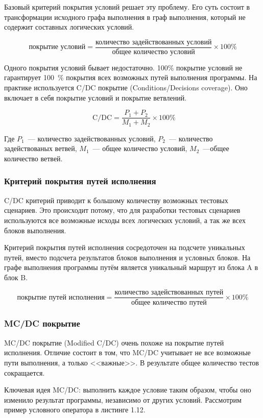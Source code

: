 Базовый критерий покрытия условий решает эту проблему. Его суть состоит в трансформации исходного графа выполнения в граф выполнения, который не содержит составных логических условий. 

\[ \text{покрытие условий} = \frac{\text{количество задействованных условий}}{\text{общее количество условий}}  \times 100 \% \]

Одного покрытия условий бывает недостаточно. 100\% покрытие условий не гарантирует 100~\% покрытия всех возможных путей выполнения программы. На практике используется C/DC покрытие (Conditions/Decisions coverage). Оно включает в себя покрытие условий и покрытие ветвлений.

\[ \text{ C/DC} = \frac{P_1 + P_2}{M_1 + M_2} \times 100 \% \]

Где \(P_1\)~--- количество задействованных условий, \(P_2\)~--- количество задействованых ветвей, \(M_1\)~--- общее количество условий, \(M_2\)~---общее количество ветвей.

\subsubsection{Критерий покрытия путей исполнения}

C/DC критерий приводит к большому количеству возможных тестовых сценариев. Это происходит потому, что для разработки тестовых сценариев используются все возможные исходы всех логических условий, а так же всех блоков выполнения.

Критерий покрытия путей исполнения сосредоточен на подсчете уникальных путей, вместо подсчета результатов блоков выполнения и условных блоков. На графе выполнения программы путём является уникальный маршрут из блока A в блок B.

\[ \text{покрытие путей исполнения} = \frac{\text{количество задействованных путей}}{\text{общее количество путей}}  \times 100 \% \]

\subsubsection{MC/DC покрытие}

MC/DC покрытие (Modified C/DC) очень похоже на покрытие путей исполнения. Отличие состоит в том, что MC/DC учитывает не все возможные пути выполнения, а только <<важные>>. В результате общее количество тестов сокращается.

Ключевая идея MC/DC: выполнить каждое условие таким образом, чтобы оно изменило результат программы, независимо от других условий. Рассмотрим пример условного оператора в листинге 1.12.

